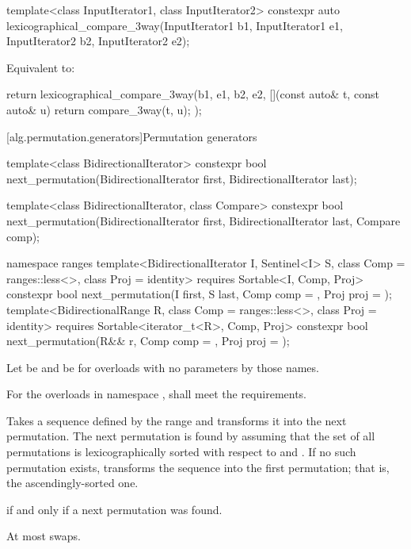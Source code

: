 %
\begin{itemdecl}
template<class InputIterator1, class InputIterator2>
  constexpr auto
    lexicographical_compare_3way(InputIterator1 b1, InputIterator1 e1,
                                 InputIterator2 b2, InputIterator2 e2);
\end{itemdecl}

\begin{itemdescr}
\pnum
\effects
Equivalent to:
\begin{codeblock}
return lexicographical_compare_3way(b1, e1, b2, e2,
                                    [](const auto& t, const auto& u) {
                                      return compare_3way(t, u);
                                    });
\end{codeblock}
\end{itemdescr}

[alg.permutation.generators]{Permutation generators}

%
\begin{itemdecl}
template<class BidirectionalIterator>
  constexpr bool next_permutation(BidirectionalIterator first,
                                  BidirectionalIterator last);

template<class BidirectionalIterator, class Compare>
  constexpr bool next_permutation(BidirectionalIterator first,
                                  BidirectionalIterator last, Compare comp);

namespace ranges {
  template<BidirectionalIterator I, Sentinel<I> S, class Comp = ranges::less<>,
           class Proj = identity>
    requires Sortable<I, Comp, Proj>
    constexpr bool
      next_permutation(I first, S last, Comp comp = {}, Proj proj = {});
  template<BidirectionalRange R, class Comp = ranges::less<>,
           class Proj = identity>
    requires Sortable<iterator_t<R>, Comp, Proj>
    constexpr bool
      next_permutation(R&& r, Comp comp = {}, Proj proj = {});
}
\end{itemdecl}

\begin{itemdescr}
\pnum
Let  be 
and  be 
for overloads with no parameters by those names.

\pnum
\requires
For the overloads in namespace ,
 shall meet
the  requirements.

\pnum
\effects
Takes a sequence defined by the range 
and transforms it into the next permutation.
The next permutation is found by assuming that the set of all permutations
is lexicographically sorted with respect to  and .
If no such permutation exists,
transforms the sequence into the first permutation;
that is, the ascendingly-sorted one.

\pnum
\returns
{} if and only if a next permutation was found.

\pnum
\complexity
At most  swaps.
\end{itemdescr}

